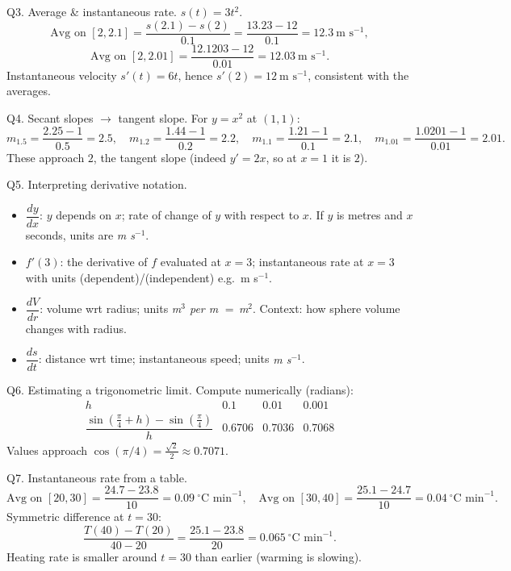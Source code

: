 \documentclass[11pt]{article}
\def\textbf#1{#1}%
\begin{document}
\begin{solution}
\textbf{Q3. Average \& instantaneous rate.}
$s(t)=3t^{2}$.
\[
\text{Avg on }[2,2.1]=\frac{s(2.1)-s(2)}{0.1}=\frac{13.23-12}{0.1}=\boxed{12.3\ \text{m s}^{-1}},
\]
\[
\text{Avg on }[2,2.01]=\frac{12.1203-12}{0.01}=\boxed{12.03\ \text{m s}^{-1}}.
\]
Instantaneous velocity $s'(t)=6t$, hence $s'(2)=\boxed{12\ \text{m s}^{-1}}$, consistent with the averages.
\end{solution}

\begin{solution}
\textbf{Q4. Secant slopes $\to$ tangent slope.}
For $y=x^{2}$ at $(1,1)$:
\[
m_{1.5}=\frac{2.25-1}{0.5}=2.5,\quad
m_{1.2}=\frac{1.44-1}{0.2}=2.2,\quad
m_{1.1}=\frac{1.21-1}{0.1}=2.1,\quad
m_{1.01}=\frac{1.0201-1}{0.01}=2.01.
\]
These approach $\boxed{2}$, the tangent slope (indeed $y'=2x$, so at $x=1$ it is $2$).
\end{solution}

\begin{solution}
\textbf{Q5. Interpreting derivative notation.}
\begin{itemize}
  \item $\dfrac{dy}{dx}$: $y$ depends on $x$; rate of change of $y$ with respect to $x$. If $y$ is metres and $x$ seconds, units are \emph{m s$^{-1}$}.
  \item $f'(3)$: the derivative of $f$ evaluated at $x=3$; instantaneous rate at $x=3$ with units (dependent)/(independent) e.g.\ m s$^{-1}$.
  \item $\dfrac{dV}{dr}$: volume wrt radius; units \emph{m$^{3}$ per m} $=\,$\emph{m$^{2}$}. Context: how sphere volume changes with radius.
  \item $\dfrac{ds}{dt}$: distance wrt time; instantaneous speed; units \emph{m s$^{-1}$}.
\end{itemize}
\end{solution}

\begin{solution}
\textbf{Q6. Estimating a trigonometric limit.}
Compute numerically (radians):
\[
\begin{array}{c|ccc}
h & 0.1 & 0.01 & 0.001\\\hline
\dfrac{\sin(\tfrac{\pi}{4}+h)-\sin(\tfrac{\pi}{4})}{h} & 0.6706 & 0.7036 & 0.7068
\end{array}
\]
Values approach $\boxed{\cos(\pi/4)=\tfrac{\sqrt2}{2}\approx0.7071}$.
\end{solution}

\begin{solution}
\textbf{Q7. Instantaneous rate from a table.}
\[
\text{Avg on }[20,30]=\frac{24.7-23.8}{10}= \boxed{0.09~^\circ\text{C min}^{-1}},
\quad
\text{Avg on }[30,40]=\frac{25.1-24.7}{10}= \boxed{0.04~^\circ\text{C min}^{-1}}.
\]
Symmetric difference at $t=30$:
\[
\frac{T(40)-T(20)}{40-20}=\frac{25.1-23.8}{20}=\boxed{0.065~^\circ\text{C min}^{-1}}.
\]
Heating rate is smaller around $t=30$ than earlier (warming is slowing).
\end{solution}
\end{document}
